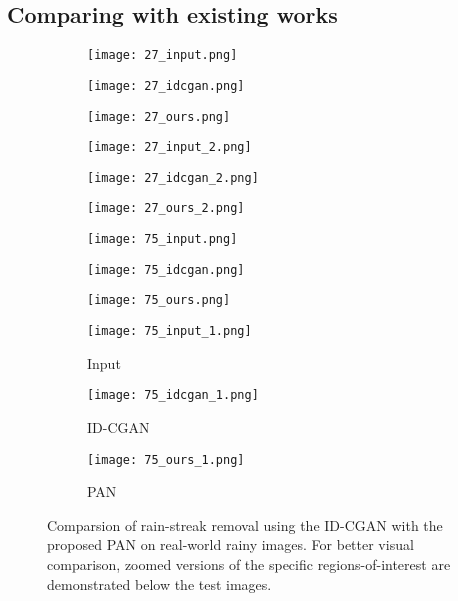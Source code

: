 \documentclass{article}
\begin{document}
\subsection{Comparing with existing works}

\begin{figure*}[!t]
\captionsetup[subfigure]{labelformat=empty}
\centering
 \begin{subfigure}[b]{0.27\textwidth}
    \texttt{[image: 27\_input.png]}%
    \label{fig_first_case}
 \end{subfigure}
 \begin{subfigure}[b]{0.27\textwidth}
    \texttt{[image: 27\_idcgan.png]}%
    \label{fig_first_case}
 \end{subfigure}
 \begin{subfigure}[b]{0.27\textwidth}
    \texttt{[image: 27\_ours.png]}%
    \label{fig_first_case}
 \end{subfigure}
 \begin{subfigure}[b]{0.27\textwidth}
    \texttt{[image: 27\_input\_2.png]}%
    \label{fig_first_case}
 \end{subfigure}
 \begin{subfigure}[b]{0.27\textwidth}
    \texttt{[image: 27\_idcgan\_2.png]}%
    \label{fig_first_case}
 \end{subfigure}
 \begin{subfigure}[b]{0.27\textwidth}
    \texttt{[image: 27\_ours\_2.png]}%
    \label{fig_first_case}
 \end{subfigure}
 \begin{subfigure}[b]{0.27\textwidth}
    \texttt{[image: 75\_input.png]}%
    \label{fig_first_case}
 \end{subfigure}
 \begin{subfigure}[b]{0.27\textwidth}
    \texttt{[image: 75\_idcgan.png]}%
    \label{fig_first_case}
 \end{subfigure}
 \begin{subfigure}[b]{0.27\textwidth}
    \texttt{[image: 75\_ours.png]}%
    \label{fig_first_case}
 \end{subfigure}
 \begin{subfigure}[b]{0.27\textwidth}
    \texttt{[image: 75\_input\_1.png]}
    \caption{Input}
    \label{fig_first_case}
 \end{subfigure}
 \begin{subfigure}[b]{0.27\textwidth}
    \texttt{[image: 75\_idcgan\_1.png]}
    \caption{ID-CGAN}
    \label{fig_first_case}
 \end{subfigure}
 \begin{subfigure}[b]{0.27\textwidth}
    \texttt{[image: 75\_ours\_1.png]}
    \caption{PAN}
    \label{fig_first_case}
 \end{subfigure}
\caption{Comparsion of rain-streak removal using the ID-CGAN with the proposed PAN on real-world rainy images. For better visual comparison, zoomed versions of the specific regions-of-interest are demonstrated below the test images.}
\label{derain_idcgan}
\end{figure*}
\end{document}

